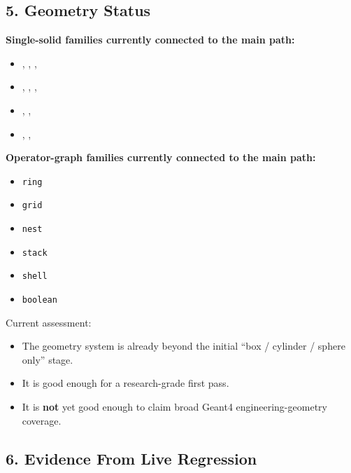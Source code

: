 \documentclass[11pt,a4paper]{ctexart}
\begin{document}
\subsection*{5. Geometry Status}

\textbf{Single-solid families currently connected to the main path:}

\begin{itemize}
\item {}, , , 
\item {}, , , 
\item {}, , 
\item {}, , 
\end{itemize}

\textbf{Operator-graph families currently connected to the main path:}

\begin{itemize}
\item \texttt{ring}
\item \texttt{grid}
\item \texttt{nest}
\item \texttt{stack}
\item \texttt{shell}
\item \texttt{boolean}
\end{itemize}

Current assessment:

\begin{itemize}
\item The geometry system is already beyond the initial ``box / cylinder / sphere only'' stage.
\item It is good enough for a research-grade first pass.
\item It is \textbf{not} yet good enough to claim broad Geant4 engineering-geometry coverage.
\end{itemize}

\subsection*{6. Evidence From Live Regression}
\end{document}
